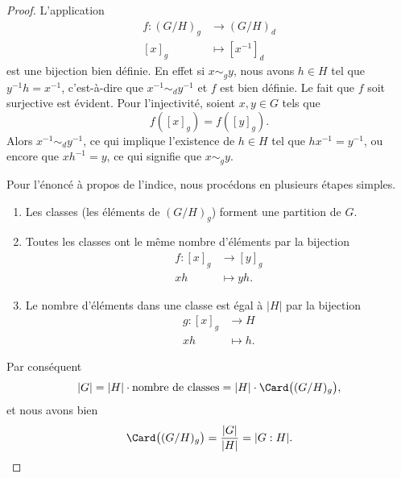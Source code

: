 \begin{proof}
	L'application
	\begin{equation}
		\begin{aligned}
			f\colon (G/H)_g & \to (G/H)_d        \\
			[x]_g           & \mapsto [x^{-1}]_d
		\end{aligned}
	\end{equation}
	est une bijection bien définie. En effet si \( x\sim_g y\), nous avons \( h\in H\) tel que \( y^{-1}h=x^{-1}\), c'est-à-dire que \( x^{-1}\sim_d y^{-1}\) et \( f\) est bien définie. Le fait que \( f\) soit surjective est évident. Pour l'injectivité, soient \( x, y \in G \) tels que
	\begin{equation}
		f([x]_g)=f([y]_g).
	\end{equation}
	Alors \( x^{-1}\sim_d y^{-1}\), ce qui implique l'existence de \( h\in H\) tel que \( hx^{-1}=y^{-1}\), ou encore que \( xh^{-1}=y\), ce qui signifie que \( x\sim_gy\).

	Pour l'énoncé à propos de l'indice, nous procédons en plusieurs étapes simples.
	\begin{enumerate}
		\item
		      Les classes (les éléments de \( (G/H)_g\)) forment une partition de $G$.
		\item
		      Toutes les classes ont le même nombre d'éléments par la bijection
		      \begin{equation}
			      \begin{aligned}
				      f\colon [x]_g & \to [y]_g   \\
				      xh            & \mapsto yh.
			      \end{aligned}
		      \end{equation}
		\item
		      Le nombre d'éléments dans une classe est égal à \( | H |\) par la bijection
		      \begin{equation}
			      \begin{aligned}
				      g\colon [x]_g & \to H      \\
				      xh            & \mapsto h.
			      \end{aligned}
		      \end{equation}
	\end{enumerate}
	Par conséquent
	\begin{equation}
		| G |=| H |\cdot \text{nombre de classes}=| H | \cdot \Card\big(  (G/H)_g \big),
	\end{equation}
	et nous avons bien
	\begin{equation}
		\Card\big( (G/H)_g \big)   =\frac{ | G | }{ | H | }=| G:H |.
	\end{equation}
\end{proof}

